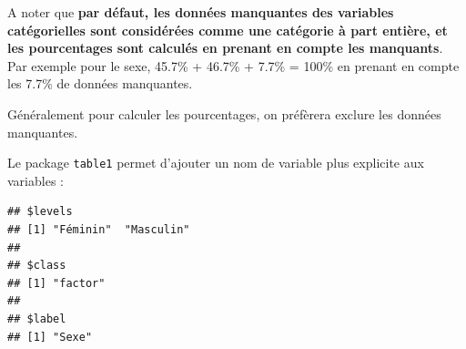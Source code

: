 \documentclass[
]{book}
\newenvironment{Shaded}{\begin{snugshade}}{\end{snugshade}}
\newcommand{\DecValTok}[1]{\textcolor[rgb]{0.00,0.00,0.81}{#1}}
\newcommand{\DocumentationTok}[1]{\textcolor[rgb]{0.56,0.35,0.01}{\textbf{\textit{#1}}}}
\newcommand{\FunctionTok}[1]{\textcolor[rgb]{0.13,0.29,0.53}{\textbf{#1}}}
\newcommand{\NormalTok}[1]{#1}
\newcommand{\OtherTok}[1]{\textcolor[rgb]{0.56,0.35,0.01}{#1}}
\newcommand{\SpecialCharTok}[1]{\textcolor[rgb]{0.81,0.36,0.00}{\textbf{#1}}}
\newcommand{\StringTok}[1]{\textcolor[rgb]{0.31,0.60,0.02}{#1}}
\begin{document}
A noter que \textbf{par défaut, les données manquantes des variables catégorielles sont considérées comme une catégorie à part entière, et les pourcentages sont calculés en prenant en compte les manquants}. Par exemple pour le sexe, 45.7\% + 46.7\% + 7.7\% = 100\% en prenant en compte les 7.7\% de données manquantes.

Généralement pour calculer les pourcentages, on préfèrera exclure les données manquantes.

Le package \texttt{table1} permet d'ajouter un nom de variable plus explicite aux variables :

\begin{Shaded}
\end{Shaded}

\begin{verbatim}
## $levels
## [1] "Féminin"  "Masculin"
## 
## $class
## [1] "factor"
## 
## $label
## [1] "Sexe"
\end{verbatim}

\begin{Shaded}
\end{Shaded}
\end{document}
